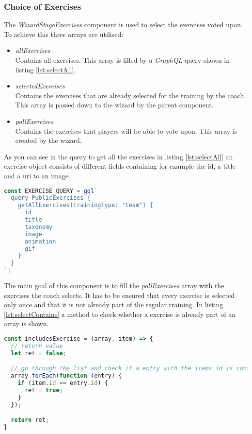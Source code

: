\subsubsection{Choice of Exercises}
\label{sssec:poll_exercises}

The \textit{WizardStageExercises} component is used to select the exercises voted upon. To achieve this three arrays are utilised:

\begin{itemize}
    \item \textit{allExercises}\\
    Contains all exercises. This array is filled by a \textit{GraphQL} query shown in listing \ref{lst:selectAll}.
    \item \textit{selectedExercises}\\
    Contains the exercises that are already selected for the training by the coach. This array is passed down to the wizard by the parent component.
    \item \textit{pollExercises}\\
    Contains the exercises that players will be able to vote upon. This array is created by the wizard.
\end{itemize}

As you can see in the query to get all the exercises in listing \ref{lst:selectAll} an exercise object consists of different fields containing for example the id, a title and a uri to an image.

\begin{lstlisting}[language=javascript, caption=\textit{GraphQL} Query AllExercises, label=lst:selectAll]
const EXERCISE_QUERY = gql`
  query PublicExercises {
    getAllExercises(trainingType: "team") {
      id
      title
      taxonomy
      image
      animation
      gif
    }
  }
`;
\end{lstlisting}

The main goal of this component is to fill the \textit{pollExercises} array with the exercises the coach selects. It has to be ensured that every exercise is selected only once and that it is not already part of the regular training. In listing \ref{lst:selectContains} a method to check whether a exercise is already part of an array is shown.
\begin{lstlisting}[language=javascript, caption=Check Include Method, label=lst:selectContains]
const includesExercise = (array, item) => {
  // return value
  let ret = false;

  // go through the list and check if a entry with the items id is contained
  array.forEach(function (entry) {
    if (item.id == entry.id) {
      ret = true;
    }
  });

  return ret;
}
\end{lstlisting}

